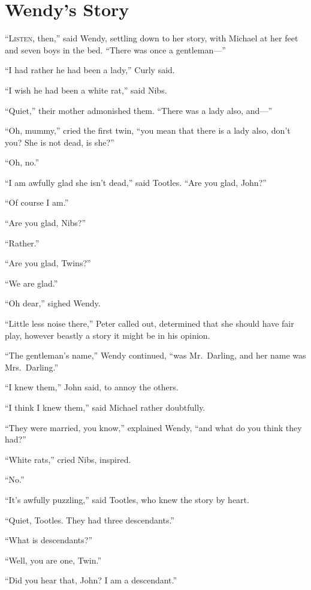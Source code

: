 \chapter{Wendy's Story}

\lettrine{``L}{isten,} then,'' said Wendy, settling down to her story, with Michael at
her feet and seven boys in the bed. ``There was once a gentleman---''

``I had rather he had been a lady,'' Curly said.

``I wish he had been a white rat,'' said Nibs.

``Quiet,'' their mother admonished them. ``There was a lady also, and---''

``Oh, mummy,'' cried the first twin, ``you mean that there is a lady also,
don't you? She is not dead, is she?''

``Oh, no.''

``I am awfully glad she isn't dead,'' said Tootles. ``Are you glad, John?''

``Of course I am.''

``Are you glad, Nibs?''

``Rather.''

``Are you glad, Twins?''

``We are glad.''

``Oh dear,'' sighed Wendy.

``Little less noise there,'' Peter called out, determined that she should
have fair play, however beastly a story it might be in his opinion.

``The gentleman's name,'' Wendy continued, ``was Mr.\ Darling, and her name
was Mrs.\ Darling.''

``I knew them,'' John said, to annoy the others.

``I think I knew them,'' said Michael rather doubtfully.

``They were married, you know,'' explained Wendy, ``and what do you think
they had?''

``White rats,'' cried Nibs, inspired.

``No.''

``It's awfully puzzling,'' said Tootles, who knew the story by heart.

``Quiet, Tootles. They had three descendants.''

``What is descendants?''

``Well, you are one, Twin.''

``Did you hear that, John? I am a descendant.''

